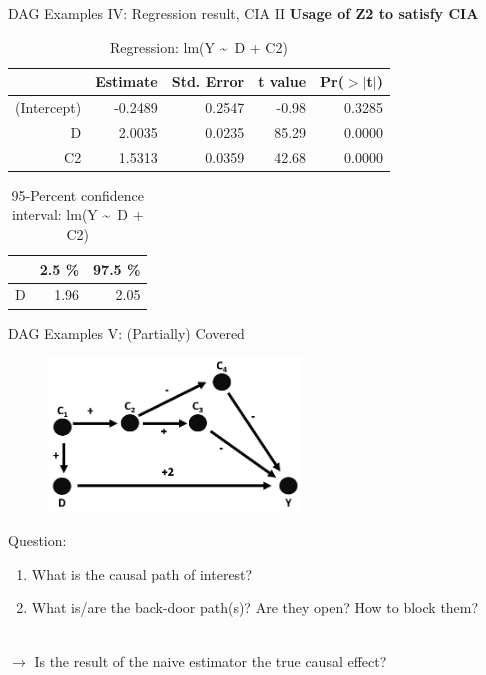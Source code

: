 \documentclass{beamer}\usepackage[]{graphicx}\usepackage[]{xcolor}
\begin{document}
\begin{frame}[fragile]{DAG Examples IV: Regression result, CIA II}
\textbf{Usage of Z2 to satisfy CIA}
\begin{table}[ht]
\centering
\begingroup\small
\begin{tabular}{rrrrr}
  \hline
 & Estimate & Std. Error & t value & Pr($>$$|$t$|$) \\ 
  \hline
(Intercept) & -0.2489 & 0.2547 & -0.98 & 0.3285 \\ 
  D & 2.0035 & 0.0235 & 85.29 & 0.0000 \\ 
  C2 & 1.5313 & 0.0359 & 42.68 & 0.0000 \\ 
   \hline
\end{tabular}
\endgroup
\caption{Regression: lm(Y \textasciitilde ~D + C2)} 
\end{table}
\begin{table}[ht]
\centering
\begingroup\small
\begin{tabular}{rrr}
  \hline
 & 2.5 \% & 97.5 \% \\ 
  \hline
D & 1.96 & 2.05 \\ 
   \hline
\end{tabular}
\endgroup
\caption{95-Percent confidence interval: lm(Y \textasciitilde ~D + C2)} 
\end{table}

\end{frame}


\begin{frame}{DAG Examples V: (Partially) Covered}
\\[1em]
\begin{figure}
\centering
\includegraphics[width=0.6\textwidth]{Graphics/5.TwoBack-doorpaths-Covered.png}
\end{figure}
Question:
\begin{enumerate}
\item What is the causal path of interest?
\item What is/are the back-door path(s)? Are they open? How to block them?
\end{enumerate}
\\[1em]
$\rightarrow$ Is the result of the naive estimator the true causal effect?
\end{frame}
\end{document}
